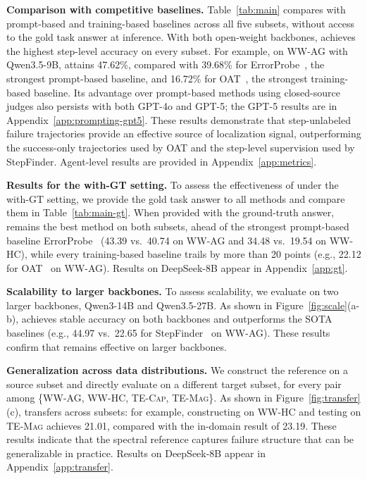 \textbf{Comparison with competitive baselines.} Table~\ref{tab:main} compares \soap with prompt-based and training-based baselines across all five subsets, without access to the gold task answer at inference. With both open-weight backbones, \soap achieves the highest step-level accuracy on every subset. For example, on \textsc{WW-AG} with Qwen3.5-9B, \soap attains 47.62\%, compared with 39.68\% for ErrorProbe~\citep{errorprobe}, the strongest prompt-based baseline, and 16.72\% for OAT~\citep{oat}, the strongest training-based baseline. Its advantage over prompt-based methods using closed-source judges also persists with both GPT-4o and GPT-5; the GPT-5 results are  in Appendix~\ref{app:prompting-gpt5}.  These results demonstrate that step-unlabeled failure trajectories provide an effective source of localization signal, outperforming the success-only trajectories used by OAT and the step-level supervision used by StepFinder. Agent-level results  are provided in Appendix~\ref{app:metrics}.






\noindent \textbf{Results for the with-GT setting.} To assess the effectiveness of \soap under the with-GT setting, we provide the gold task answer to all methods and compare them in Table~\ref{tab:main-gt}. When provided with the ground-truth answer, \soap remains the best method on both subsets, ahead of the strongest prompt-based baseline ErrorProbe~\citep{errorprobe} (43.39 vs.\ 40.74 on \textsc{WW-AG} and 34.48 vs.\ 19.54 on \textsc{WW-HC}), while every training-based baseline trails by more than 20 points (e.g., 22.12 for OAT~\citep{oat} on \textsc{WW-AG}). Results on DeepSeek-8B appear in Appendix~\ref{app:gt}. 


\textbf{Scalability to larger backbones.} To assess scalability, we evaluate \soap on two larger backbones, Qwen3-14B and Qwen3.5-27B. As shown in Figure~\ref{fig:scale}(a-b), \soap achieves stable accuracy on both backbones and outperforms the SOTA baselines (e.g., 44.97 vs.\ 22.65 for StepFinder~\citep{zhu2026stepfinder} on \textsc{WW-AG}). These results confirm that \soap remains effective on larger backbones.

\textbf{Generalization across data distributions.} We construct the reference on a source subset and directly evaluate \soap on a different target subset, for every pair among \{\textsc{WW-AG}, \textsc{WW-HC}, \textsc{TE-Cap}, \textsc{TE-Mag}\}. As shown in Figure~\ref{fig:transfer}(c), \soap transfers across subsets: for example, constructing on \textsc{WW-HC} and testing on \textsc{TE-Mag} achieves 21.01, compared with the in-domain result of 23.19. These results indicate that the spectral reference captures failure structure that can be generalizable in practice. Results on DeepSeek-8B appear in Appendix~\ref{app:transfer}.






